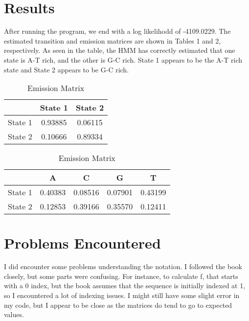 \documentclass{acm_proc_article-sp}
\begin{document}
\section{Results}
After running the program, we end with a log likelihodd of -4109.0229.  The estimated transition and emission matrices are shown in Tables 1 and 2, respectively.  As seen in the table, the HMM has correctly estimated that one state is A-T rich, and the other is G-C rich.  State 1 appears to be the A-T rich state and State 2 appears to be G-C rich.  

\begin{table}
\centering
\caption{Transition Matrix}
\label{posmat}
\begin{tabular}{|c|c|c|} \hline
 &State 1&State 2\\ \hline
State 1  &0.93885 &0.06115  \\ \hline
State 2  &0.10666  &0.89334 \\ 
\hline\end{tabular}
\vspace{1.8em}
\caption{Emission Matrix}
\label{negmat}
\begin{tabular}{|c|c|c|c|c|} \hline
 &A&C&G&T\\ \hline
State 1  &0.40383  &0.08516  &0.07901  &0.43199 \\ \hline
State 2  &0.12853  &0.39166  &0.35570  &0.12411 \\ 
\hline\end{tabular}
\end{table}

\section{Problems Encountered}
I did encounter some problems understanding the notation.  I followed the book closely, but some parts were confusing.  For instance, to calculate f, that starts with a 0 index, but the book assumes that the sequence is initially indexed at 1, so I encountered a lot of indexing issues.  I might still have some slight error in my code, but I appear to be close as the matrices do tend to go to expected values.  




%


%
%

\balancecolumns
\end{document}
